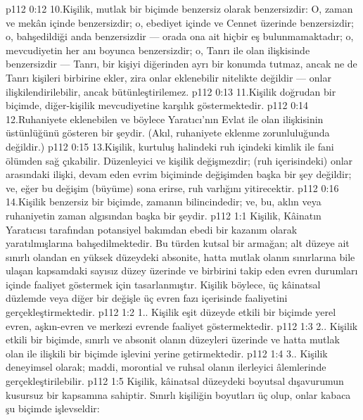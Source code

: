 \vs p112 0:12 10.\bibnobreakspace Kişilik, mutlak bir biçimde benzersiz olarak benzersizdir: O, zaman ve mekân içinde benzersizdir; o, ebediyet içinde ve Cennet üzerinde benzersizdir; o, bahşedildiği anda benzersizdir --- orada ona ait hiçbir eş bulunmamaktadır; o, mevcudiyetin her anı boyunca benzersizdir; o, Tanrı ile olan ilişkisinde benzersizdir --- Tanrı, bir kişiyi diğerinden ayrı bir konumda tutmaz, ancak ne de Tanrı kişileri birbirine ekler, zira onlar eklenebilir nitelikte değildir --- onlar ilişkilendirilebilir, ancak bütünleştirilemez.
\vs p112 0:13 11.\bibnobreakspace Kişilik doğrudan bir biçimde, diğer\hyp{}kişilik mevcudiyetine karşılık göstermektedir.
\vs p112 0:14 12.\bibnobreakspace Ruhaniyete eklenebilen ve böylece Yaratıcı’nın Evlat ile olan ilişkisinin üstünlüğünü gösteren bir şeydir. (Akıl, ruhaniyete eklenme zorunluluğunda değildir.)
\vs p112 0:15 13.\bibnobreakspace Kişilik, kurtuluş halindeki ruh içindeki kimlik ile fani ölümden sağ çıkabilir. Düzenleyici ve kişilik değişmezdir; (ruh içerisindeki) onlar arasındaki ilişki, devam eden evrim biçiminde değişimden başka bir şey değildir; ve, eğer bu değişim (büyüme) sona erirse, ruh varlığını yitirecektir.
\vs p112 0:16 14.\bibnobreakspace Kişilik benzersiz bir biçimde, zamanın bilincindedir; ve, bu, aklın veya ruhaniyetin zaman algısından başka bir şeydir.
\vs p112 1:1 Kişilik, Kâinatın Yaratıcısı tarafından potansiyel bakımdan ebedi bir kazanım olarak yaratılmışlarına bahşedilmektedir. Bu türden kutsal bir armağan; alt düzeye ait sınırlı olandan en yüksek düzeydeki absonite, hatta mutlak olanın sınırlarına bile ulaşan kapsamdaki sayısız düzey üzerinde ve birbirini takip eden evren durumları içinde faaliyet göstermek için tasarlanmıştır. Kişilik böylece, üç kâinatsal düzlemde veya diğer bir değişle üç evren fazı içerisinde faaliyetini gerçekleştirmektedir.
\vs p112 1:2 1.\bibnobreakspace {}. Kişilik eşit düzeyde etkili bir biçimde yerel evren, aşkın\hyp{}evren ve merkezi evrende faaliyet göstermektedir.
\vs p112 1:3 2.. Kişilik etkili bir biçimde, sınırlı ve absonit olanın düzeyleri üzerinde ve hatta mutlak olan ile ilişkili bir biçimde işlevini yerine getirmektedir.
\vs p112 1:4 3.\bibnobreakspace {}. Kişilik deneyimsel olarak; maddi, morontial ve ruhsal olanın ilerleyici âlemlerinde gerçekleştirilebilir.
\vs p112 1:5 Kişilik, kâinatsal düzeydeki boyutsal dışavurumun kusursuz bir kapsamına sahiptir. Sınırlı kişiliğin boyutları üç olup, onlar kabaca şu biçimde işlevseldir:
